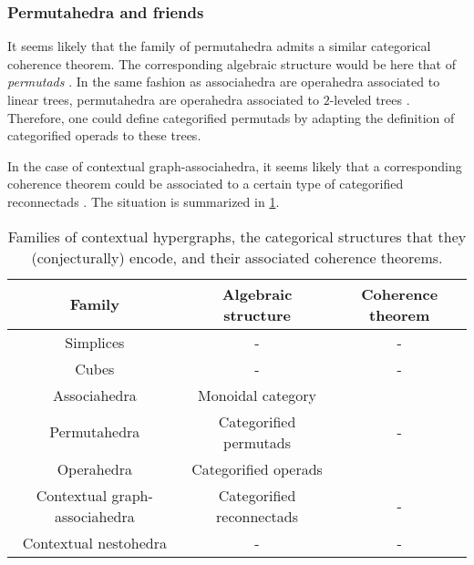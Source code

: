 
\subsubsection{Permutahedra and friends}
It seems likely that the family of permutahedra admits a similar categorical coherence theorem. 
The corresponding algebraic structure would be here that of \emph{permutads} \cite{LodayRonco11,Markl19}. 
In the same fashion as associahedra are operahedra associated to linear trees, permutahedra are operahedra associated to $2$-leveled trees \cite[Def.~2.8]{laplante-anfossiDiagonalOperahedra2022a}.
Therefore, one could define categorified permutads by adapting the definition of categorified operads \cite{CLA1} to these trees.

In the case of contextual graph-associahedra, it seems likely that a corresponding coherence theorem could be associated to a certain type of categorified reconnectads \cite{DotsenkoKeilthyLyskov}.
The situation is summarized in \cref{table:contextual-hyper}.

\begin{table}[h!]
	\begin{center}
	\begin{tabular}{c|c|c}
	Family & Algebraic structure & Coherence theorem \\
	\hline
	Simplices & - & - \\
	Cubes & - & - \\
	Associahedra & Monoidal category & \cite{MacLane63} \\
	Permutahedra & Categorified permutads & - \\
	Operahedra & Categorified operads & \cite{DP15,CLA1} \\
	Contextual graph-associahedra & Categorified reconnectads & - \\
	Contextual nestohedra & - & - 
	\end{tabular}
	\end{center}
  \caption{Families of contextual hypergraphs, the categorical structures that they (conjecturally) encode, and their associated coherence theorems.}
  \label{table:contextual-hyper}
\end{table}






